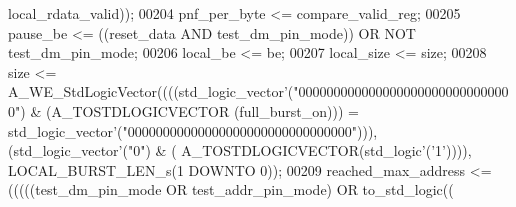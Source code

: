 \begin{DoxyCode}
      local\_rdata\_valid));
00204   \textcolor{vhdlchar}{pnf_per_byte} \textcolor{vhdlchar}{<=} \textcolor{vhdlchar}{compare_valid_reg};
00205   \textcolor{vhdlchar}{pause_be} \textcolor{vhdlchar}{<=} \textcolor{vhdlchar}{(}\textcolor{vhdlchar}{(}\textcolor{vhdlchar}{reset_data} \textcolor{keywordflow}{AND} \textcolor{vhdlchar}{test_dm_pin_mode}\textcolor{vhdlchar}{)}\textcolor{vhdlchar}{)} \textcolor{keywordflow}{OR} \textcolor{keywordflow}{NOT} \textcolor{vhdlchar}{test_dm_pin_mode};
00206   local\_be <= be;
00207   local\_size <= size;
00208   \textcolor{vhdlchar}{size} \textcolor{vhdlchar}{<=} \textcolor{vhdlchar}{A\_WE\_StdLogicVector}\textcolor{vhdlchar}{(}\textcolor{vhdlchar}{(}\textcolor{vhdlchar}{(}\textcolor{vhdlchar}{(}\textcolor{comment}{std\_logic\_vector}\textcolor{vhdlchar}{'}\textcolor{vhdlchar}{(}\textcolor{vhdllogic}{"0000000000000000000000000000000"}\textcolor{vhdlchar}{)} \textcolor{vhdlchar}{&} \textcolor{vhdlchar}{(}\textcolor{vhdlchar}{A\_TOSTDLOGICVECTOR}\textcolor{vhdlchar}{
      (}\textcolor{vhdlchar}{full_burst_on}\textcolor{vhdlchar}{)}\textcolor{vhdlchar}{)}\textcolor{vhdlchar}{)} \textcolor{vhdlchar}{=} \textcolor{comment}{std\_logic\_vector}\textcolor{vhdlchar}{'}\textcolor{vhdlchar}{(}\textcolor{vhdllogic}{"00000000000000000000000000000000"}\textcolor{vhdlchar}{)}\textcolor{vhdlchar}{)}\textcolor{vhdlchar}{)}\textcolor{vhdlchar}{,} \textcolor{vhdlchar}{(}\textcolor{comment}{std\_logic\_vector}\textcolor{vhdlchar}{'}\textcolor{vhdlchar}{(}\textcolor{vhdllogic}{"0"}\textcolor{vhdlchar}{)} \textcolor{vhdlchar}{&} \textcolor{vhdlchar}{(}\textcolor{vhdlchar}{
      A\_TOSTDLOGICVECTOR}\textcolor{vhdlchar}{(}\textcolor{comment}{std\_logic}\textcolor{vhdlchar}{'}\textcolor{vhdlchar}{(}\textcolor{vhdlchar}{'}\textcolor{vhdllogic}{}\textcolor{vhdllogic}{1}\textcolor{vhdlchar}{'}\textcolor{vhdlchar}{)}\textcolor{vhdlchar}{)}\textcolor{vhdlchar}{)}\textcolor{vhdlchar}{)}\textcolor{vhdlchar}{,} \textcolor{vhdlchar}{LOCAL_BURST_LEN_s}\textcolor{vhdlchar}{(}\textcolor{vhdllogic}{}\textcolor{vhdllogic}{1} \textcolor{keywordflow}{DOWNTO} \textcolor{vhdllogic}{}\textcolor{vhdllogic}{0}\textcolor{vhdlchar}{)}\textcolor{vhdlchar}{)};
00209   \textcolor{vhdlchar}{reached_max_address} \textcolor{vhdlchar}{<=} \textcolor{vhdlchar}{(}\textcolor{vhdlchar}{(}\textcolor{vhdlchar}{(}\textcolor{vhdlchar}{(}\textcolor{vhdlchar}{(}\textcolor{vhdlchar}{test_dm_pin_mode} \textcolor{keywordflow}{OR} \textcolor{vhdlchar}{test_addr_pin_mode}\textcolor{vhdlchar}{)} \textcolor{keywordflow}{OR} \textcolor{vhdlchar}{to\_std\_logic}\textcolor{vhdlchar}{(}\textcolor{vhdlchar}{(}\textcolor{vhdlchar}{
}
\end{DoxyCode}
